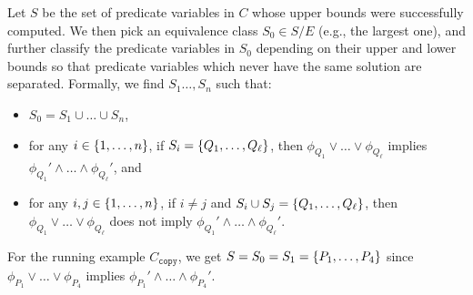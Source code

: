 Let \(S\) be the set of predicate variables in \(C\) whose upper bounds
were successfully computed.  We then pick an equivalence class \(S_0 \in
S / E\) (e.g., the largest one), and further classify the predicate
variables in \(S_0\) depending on their upper and lower bounds so that
predicate variables which never have the same solution are separated.
%
Formally, we find \(S_1\dots,S_n\) such that:
\begin{itemize}
\item \(S_0 = S_1 \cup \dots \cup S_n\),
\item for any \(i \in \{{1,\dots,n}\}\), if \(S_i =
\{{Q_1,\dots,Q_{\ell}}\}\), then \(\phi_{Q_1} \lor \dots \lor
\phi_{Q_{\ell}}\) implies \(\phi_{Q_1}' \land \dots \land
\phi_{Q_{\ell}}'\), and
\item for any \(i,j \in \{{1,\dots,n}\}\), if \(i \neq j\) and
\(S_i \cup S_j = \{{Q_1,\dots,Q_{\ell}}\}\), then \(\phi_{Q_1} \lor
\dots \lor \phi_{Q_{\ell}}\) does not imply \(\phi_{Q_1}' \land \dots
\land \phi_{Q_{\ell}}'\).
\end{itemize}
For the running example \(C_{\texttt{copy}}\), we get
\(S=S_0=S_1=\{{P_1,\dots,P_4}\}\) since \(\phi_{P_1} \lor \dots \lor
\phi_{P_4}\) implies \(\phi_{P_1}' \land \dots \land \phi_{P_4}'\).

